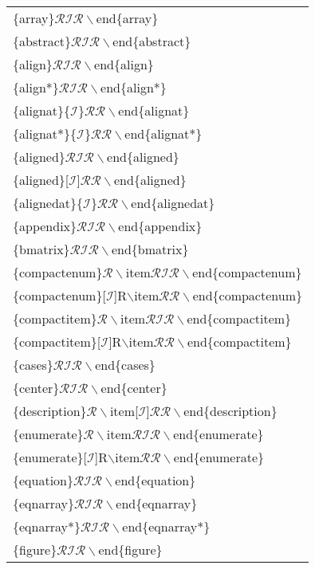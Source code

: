 \ttfamily
\begin{longtable}{p{100mm}}
\{array\}$\mathcal{RIR}\backslash$end\{array\}\\
\{abstract\}$\mathcal{RIR}\backslash$end\{abstract\}\\
\{align\}$\mathcal{RIR}\backslash$end\{align\}\\
\{align*\}$\mathcal{RIR}\backslash$end\{align*\}\\
\{alignat\}\{$\mathcal{I}$\}$\mathcal{RR}\backslash$end\{alignat\}\\
\{alignat*\}\{$\mathcal{I}$\}$\mathcal{RR}\backslash$end\{alignat*\}\\
\{aligned\}$\mathcal{RIR}\backslash$end\{aligned\}\\
\{aligned\}[$\mathcal{I}$]$\mathcal{RR}\backslash$end\{aligned\}\\
\{alignedat\}\{$\mathcal{I}$\}$\mathcal{RR}\backslash$end\{alignedat\}\\
\{appendix\}$\mathcal{RIR}\backslash$end\{appendix\}\\
\{bmatrix\}$\mathcal{RIR}\backslash$end\{bmatrix\}\\
\{compactenum\}$\mathcal{R}\backslash$item$\mathcal{RIR}\backslash$end\{compactenum\}\\
\{compactenum\}[$\mathcal{I}$]R$\backslash$item$\mathcal{RR}\backslash$end\{compactenum\}\\
\{compactitem\}$\mathcal{R}\backslash$item$\mathcal{RIR}\backslash$end\{compactitem\}\\
\{compactitem\}[$\mathcal{I}$]R$\backslash$item$\mathcal{RR}\backslash$end\{compactitem\}\\
\{cases\}$\mathcal{RIR}\backslash$end\{cases\}\\
\{center\}$\mathcal{RIR}\backslash$end\{center\}\\
\{description\}$\mathcal{R}\backslash$item[$\mathcal{I}$]$\mathcal{RR}\backslash$end\{description\}\\
\{enumerate\}$\mathcal{R}\backslash$item$\mathcal{RIR}\backslash$end\{enumerate\}\\
\{enumerate\}[$\mathcal{I}$]R$\backslash$item$\mathcal{RR}\backslash$end\{enumerate\}\\
\{equation\}$\mathcal{RIR}\backslash$end\{equation\}\\
\{eqnarray\}$\mathcal{RIR}\backslash$end\{eqnarray\}\\
\{eqnarray*\}$\mathcal{RIR}\backslash$end\{eqnarray*\}\\
\{figure\}$\mathcal{RIR}\backslash$end\{figure\}\\

\end{longtable}
